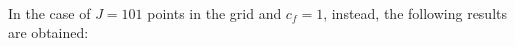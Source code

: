 \documentclass[11pt,a4paper]{article}
\begin{document}
\begin{figure}[!h]
\centering
{}
\end{figure} \ \\
In the case of $J=101$ points in the grid and $c_f=1$, instead, the following results are obtained:
\end{document}
